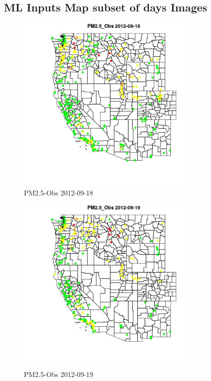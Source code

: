\subsection{ML Inputs Map subset of days Images} 
 

\begin{figure} 
\centering  
\includegraphics[width=0.77\textwidth]{Code_Outputs/ML_input_report_ML_input_PM25_Step5_part_d_de_duplicated_aves_ML_input_MapObsPM25_Obs2012-09-18.jpg} 
\caption{\label{fig:ML_input_report_ML_input_PM25_Step5_part_d_de_duplicated_aves_ML_inputMapObsPM25_Obs2012-09-18}PM2.5-Obs 2012-09-18} 
\end{figure} 
 

\begin{figure} 
\centering  
\includegraphics[width=0.77\textwidth]{Code_Outputs/ML_input_report_ML_input_PM25_Step5_part_d_de_duplicated_aves_ML_input_MapObsPM25_Obs2012-09-19.jpg} 
\caption{\label{fig:ML_input_report_ML_input_PM25_Step5_part_d_de_duplicated_aves_ML_inputMapObsPM25_Obs2012-09-19}PM2.5-Obs 2012-09-19} 
\end{figure} 
 

